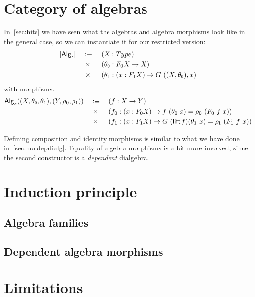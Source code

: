 \documentclass[a4paper,10pt]{report}
\begin{document}
\section{Category of algebras}

In~\cref{sec:hits} we have seen what the algebras and algebra
morphisms look like in the general case, so we can instantiate it for
our restricted version:
%
\begin{alignat*}{3}
&|\Alg_s| &&\ddefeq &&\ (X : Type) \\
&&&\ \times &&\ (\theta_0 : F_0 X \to X) \\
&&&\ \times &&\ (\theta_1 : (x : F_1 X) \to G\ ((X,\theta_0),x)
\end{alignat*}
%
with morphisms:
\begin{alignat*}{3}
  &\Alg_s((X,\theta_0,\theta_1),(Y,\rho_0,\rho_1)) &&\ddefeq &&\ (f : X \to Y) \\
  &&&\ \times &&\ (f_0 : (x : F_0 X) \to f\ (\theta_0\ x) = \rho_0\ (F_0\ f\ x)) \\
  &&&\ \times &&\ (f_1 : (x : F_1 X) \to G\ (\lift f) (\theta_1\ x) = \rho_1\ (F_1\ f\ x))
\end{alignat*}

Defining composition and identity morphisms is similar to what we have
done in~\cref{sec:nondepdialg}. Equality of algebra morphisms is a bit
more involved, since the second constructor is a \emph{dependent}
dialgebra.

\section{Induction principle}


\subsection{Algebra families}


\subsection{Dependent algebra morphisms}


\section{Limitations}
\end{document}
